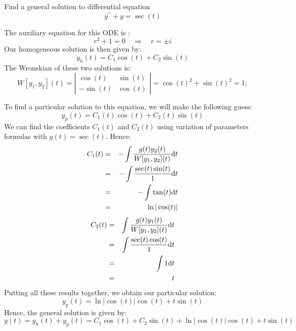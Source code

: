 \documentclass[11pt]{article}
\begin{document}
\begin{problem}
Find a general solution to differential equation
\begin{equation*}
y^{\prime \prime} + y = \sec(t)
\end{equation*}
\end{problem}
\begin{solution}
The auxiliary equation for this ODE is :
\begin{equation*}
r^2 +1 =0 \quad \Rightarrow \quad r = \pm i
\end{equation*}
Our homogeneous solution is then given by:
\begin{equation*}
y_{h}(t) = C_{1} \cos(t) + C_{2} \sin(t)
\end{equation*}
The Wronskian of these two solutions is:
\begin{equation*}
W[y_{1},y_{2}](t) = \left| \begin{array}{cc} \cos(t) & \sin(t) \\
-\sin(t) & \cos(t) \end{array} \right| = \cos(t)^2 + \sin(t)^2 =1;
\end{equation*}

To find a particular solution to this equation, we will make the following guess:
\begin{equation*}
y_{p}(t) = C_{1}(t) \cos(t) + C_{2}(t) \sin(t)
\end{equation*}
We can find the coefficients $C_{1}(t)$ and $C_{2}(t)$ using variation of parameters formulas with $g(t) = \sec(t)$.
Hence:
\begin{eqnarray*}
C_{1}(t) & = & - \int \dfrac{g(t) y_{2}(t)}{W[y_{1},y_{2}](t)} {\rm d} t \\
& = & - \int \dfrac{\sec(t) \sin(t)}{1} {\rm d} t \\
& = & - \int \tan(t) {\rm d} t \\
& = & \ln|\cos(t)| \\
\end{eqnarray*}
\begin{eqnarray*}
C_{2}(t) & = &  \int \dfrac{g(t) y_{1}(t)}{W[y_{1},y_{2}](t)} {\rm d} t \\
& = &  \int \dfrac{\sec(t) \cos(t)}{1} {\rm d} t \\
& = & \int 1 {\rm d} t \\
& = & t \\
\end{eqnarray*}
Putting all these results together, we obtain our particular solution:
\begin{equation*}
y_{p}(t) = \ln|\cos(t)| \cos(t) + t \sin(t)
\end{equation*}
Hence, the general solution is given by:
\begin{equation*}
\boxed{y(t) = y_{h}(t) + y_{p}(t) = C_{1} \cos(t) + C_{2} \sin(t)+ \ln|\cos(t)| \cos(t) + t \sin(t)}
\end{equation*}
\end{solution}
\end{document}
